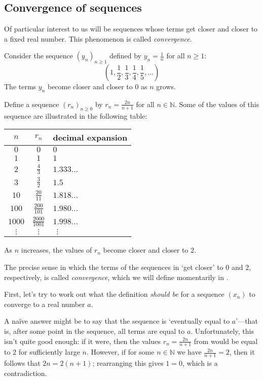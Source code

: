 \subsection*{Convergence of sequences}

Of particular interest to us will be sequences whose terms get closer and closer to a fixed real number. This phenomenon is called \textit{convergence}.

\begin{example}
\label{exOneOverN}
Consider the sequence $(y_n)_{n \ge 1}$ defined by $y_n = \frac{1}{n}$ for all $n \ge 1$:
\[ \left( 1, \frac{1}{2}, \frac{1}{3}, \frac{1}{4}, \frac{1}{5}, \dots\right) \]
The terms $y_n$ become closer and closer to $0$ as $n$ grows.
\end{example}

\begin{example}
\label{exTwoNOverNPlusOne}
Define a sequence $(r_n)_{n \ge 0}$ by $r_n = \frac{2n}{n+1}$ for all $n \in \mathbb{N}$. Some of the values of this sequence are illustrated in the following table:
\begin{center}
\begin{tabular}{c|c|l}
$n$ & $r_n$ & decimal expansion \\ \hline
$0$ & $0$ & $0$ \\
$1$ & $1$ & $1$ \\
$2$ & $\frac{4}{3}$ & $1.333\dots$ \\
$3$ & $\frac{3}{2}$ & $1.5$ \\
$10$ & $\frac{20}{11}$ & $1.818\dots$ \\
$100$ & $\frac{200}{101}$ & $1.980\dots$ \\
$1000$ & $\frac{2000}{1001}$ & $1.998\dots$ \\
$\vdots$ & $\vdots$ & $\ \ \vdots$
\end{tabular}
\end{center}
As $n$ increases, the values of $r_n$ become closer and closer to $2$.
\end{example}

The precise sense in which the terms of the sequences in  `get closer' to $0$ and $2$, respectively, is called \textit{convergence}, which we will define momentarily in .

First, let's try to work out what the definition \textit{should be} for a sequence $(x_n)$ to converge to a real number $a$.

A na\"{i}ve answer might be to say that the sequence is `eventually equal to $a$'---that is, after some point in the sequence, all terms are equal to $a$. Unfortunately, this isn't quite good enough: if it were, then the values $r_n = \frac{2n}{n+1}$ from  would be equal to $2$ for sufficiently large $n$. However, if for some $n \in \mathbb{N}$ we have $\frac{2n}{n+1}=2$, then it follows that $2n=2(n+1)$; rearranging this gives $1=0$, which is a contradiction.

